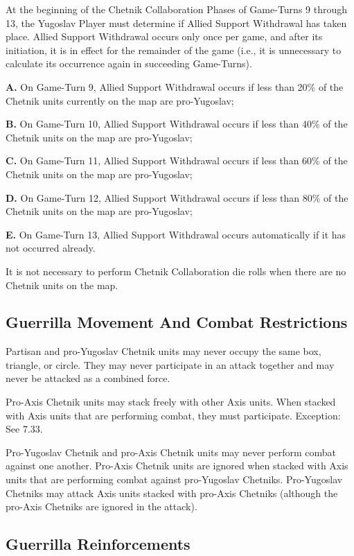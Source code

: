  At the beginning of the Chetnik Collaboration Phases of Game-Turns 9 through 13, the Yugoslav Player must determine if Allied Support Withdrawal has taken place. Allied Support Withdrawal occurs only once per game, and after its initiation, it is in effect for the remainder of the game (i.e., it is unnecessary to calculate its occurrence again in succeeding Game-Turns).

\textbf{A.} On Game-Turn 9, Allied Support Withdrawal occurs if less than 20\% of the Chetnik units currently on the map are pro-Yugoslav;

\textbf{B.} On Game-Turn 10, Allied Support Withdrawal occurs if less than 40\% of the Chetnik units on the map are pro-Yugoslav;

\textbf{C.} On Game-Turn 11, Allied Support Withdrawal occurs if less than 60\% of the Chetnik units on the map are pro-Yugoslav;

\textbf{D.} On Game-Turn 12, Allied Support Withdrawal occurs if less than 80\% of the Chetnik units on the map are pro-Yugoslav;

\textbf{E.} On Game-Turn 13, Allied Support Withdrawal occurs automatically if it has not occurred already.

 It is not necessary to perform Chetnik Collaboration die rolls when there are no Chetnik units on the map.

\subsection{Guerrilla Movement And Combat Restrictions}\label{sec:7.3}

 Partisan and pro-Yugoslav Chetnik units may never occupy the same box, triangle, or circle. They may never participate in an attack together and may never be attacked as a combined force.

 Pro-Axis Chetnik units may stack freely with other Axis units. When stacked with Axis units that are performing combat, they must participate. Exception: See 7.33.

 Pro-Yugoslav Chetnik and pro-Axis Chetnik units may never perform combat against one another. Pro-Axis Chetnik units are ignored when stacked with Axis units that are performing combat against pro-Yugoslav Chetniks. Pro-Yugoslav Chetniks may attack Axis units stacked with pro-Axis Chetniks (although the pro-Axis Chetniks are ignored in the attack).

\subsection{Guerrilla Reinforcements}\label{sec:7.4}

